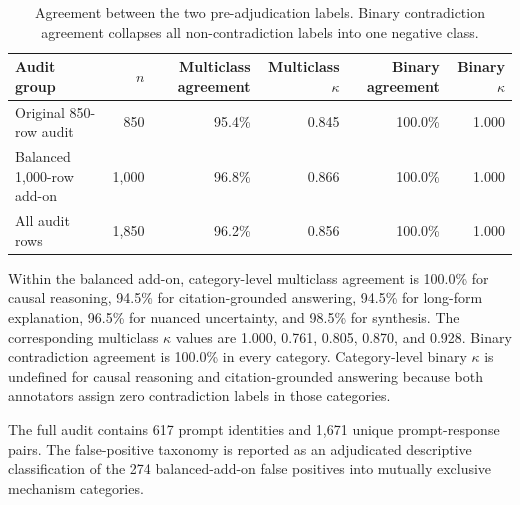 \documentclass[11pt]{article}
\begin{document}
\begin{table}[H]
\centering
\small
\caption{Agreement between the two pre-adjudication labels. Binary contradiction agreement collapses all non-contradiction labels into one negative class.}
\label{tab:annotation-agreement}
\begin{tabular}{lrrrrr}
\toprule
Audit group & $n$ & Multiclass agreement & Multiclass $\kappa$ & Binary agreement & Binary $\kappa$\\
\midrule
Original 850-row audit & 850 & 95.4\% & 0.845 & 100.0\% & 1.000\\
Balanced 1,000-row add-on & 1,000 & 96.8\% & 0.866 & 100.0\% & 1.000\\
All audit rows & 1,850 & 96.2\% & 0.856 & 100.0\% & 1.000\\
\bottomrule
\end{tabular}
\end{table}

Within the balanced add-on, category-level multiclass agreement is 100.0\% for causal reasoning, 94.5\% for citation-grounded answering, 94.5\% for long-form explanation, 96.5\% for nuanced uncertainty, and 98.5\% for synthesis. The corresponding multiclass $\kappa$ values are 1.000, 0.761, 0.805, 0.870, and 0.928. Binary contradiction agreement is 100.0\% in every category. Category-level binary $\kappa$ is undefined for causal reasoning and citation-grounded answering because both annotators assign zero contradiction labels in those categories.

The full audit contains 617 prompt identities and 1,671 unique prompt-response pairs. The false-positive taxonomy is reported as an adjudicated descriptive classification of the 274 balanced-add-on false positives into mutually exclusive mechanism categories.
\end{document}
